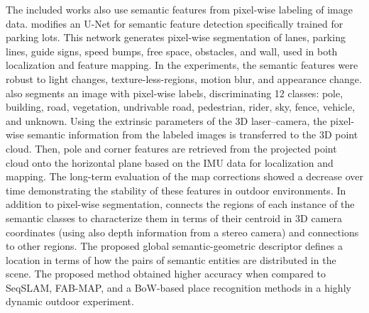 The included works also use semantic features from pixel-wise labeling of image data.
\cite{qin-et-al:2020:9340939} modifies an U-Net for semantic feature detection specifically trained for parking lots. This network generates pixel-wise segmentation of lanes, parking lines, guide signs, speed bumps, free space, obstacles, and wall, used in both localization and feature mapping. In the experiments, the semantic features were robust to light changes, texture-less-regions, motion blur, and appearance change.
\cite{berrio-et-al:2021:3094485} also segments an image with pixel-wise labels, discriminating 12 classes: pole, building, road, vegetation, undrivable road, pedestrian, rider, sky, fence, vehicle, and unknown. Using the extrinsic parameters of the 3D laser--camera, the pixel-wise semantic information from the labeled images is transferred to the 3D point cloud. Then, pole and corner features are retrieved from the projected point cloud onto the horizontal plane based on the IMU data for localization and mapping. The long-term evaluation of the map corrections showed a decrease over time demonstrating the stability of these features in outdoor environments.
In addition to pixel-wise segmentation, \cite{singh-et-al:2021:9564866} connects the regions of each instance of the semantic classes to characterize them in terms of their centroid in 3D camera coordinates (using also depth information from a stereo camera) and connections to other regions. The proposed global semantic-geometric descriptor defines a location in terms of how the pairs of semantic entities are distributed in the scene. The proposed method obtained higher accuracy when compared to SeqSLAM, FAB-MAP, and a BoW-based place recognition methods in a highly dynamic outdoor experiment.

